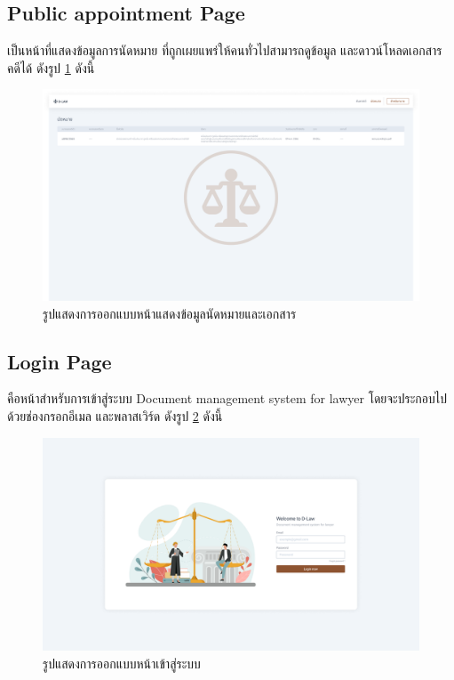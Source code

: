 \documentclass[12pt,oneside,openright,a4paper]{cpe-thai-project}
\begin{document}
\newpage
\subsection{Public appointment Page}
\hspace*{1cm} เป็นหน้าที่แสดงข้อมูลการนัดหมาย ที่ถูกเผยแพร่ให้คนทั่วไปสามารถดูข้อมูล และดาวน์โหลดเอกสารคดีได้ ดังรูป \ref{fig:appoinmtment-page} ดังนี้ 
\begin{figure}[!h]\centering
  \includegraphics[width=13cm]{./assets/userinterface/appointment-public.png}
  \caption{รูปแสดงการออกแบบหน้าแสดงข้อมูลนัดหมายและเอกสาร}\label{fig:appoinmtment-page}
\end{figure}

\subsection{Login Page}
\hspace*{1cm} คือหน้าสำหรับการเข้าสู่ระบบ Document management system for lawyer โดยจะประกอบไปด้วยช่องกรอกอีเมล และพลาสเวิร์ด ดังรูป \ref{fig:login-page} ดังนี้
\begin{figure}[!h]\centering
  \includegraphics[width=13cm]{./assets/userinterface/login-page.png}
  \caption{รูปแสดงการออกแบบหน้าเข้าสู่ระบบ}\label{fig:login-page}
\end{figure}
\end{document}
